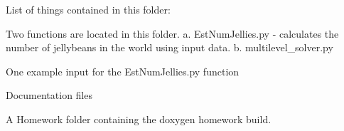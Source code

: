 List of things contained in this folder\+:


\begin{DoxyEnumerate}
\item Two functions are located in this folder. a. Est\+Num\+Jellies.\+py -\/ calculates the number of jellybeans in the world using input data. b. multilevel\+\_\+solver.\+py
\item One example input for the Est\+Num\+Jellies.\+py function
\item Documentation files
\item A Homework folder containing the doxygen homework build. 
\end{DoxyEnumerate}